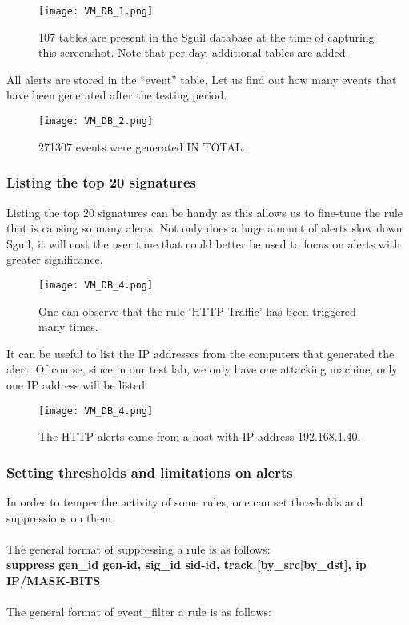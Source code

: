 \begin{figure}[h]
    \centering
    \texttt{[image: VM\_DB\_1.png]}
    \caption{107 tables are present in the Sguil database at the time of capturing this screenshot. Note that per day, additional tables are added.}
\end{figure}
\clearpage
All alerts are stored in the ``event'' table. Let us find out how many events that have been generated after the testing period.

\begin{figure}[h]
    \centering
    \texttt{[image: VM\_DB\_2.png]}
    \caption{271307 events were generated IN TOTAL.}
\end{figure}

\subsubsection{Listing the top 20 signatures}

Listing the top 20 signatures can be handy as this allows us to fine-tune the rule that is causing so many alerts. Not only does a huge amount of alerts slow down Sguil, it will cost the user time that could better be used to focus on alerts with greater significance.

\begin{figure}[h]
    \centering
    \texttt{[image: VM\_DB\_4.png]}
    \caption{One can observe that the rule `HTTP Traffic' has been triggered many times.}
\end{figure}
It can be useful to list the IP addresses from the computers that generated the alert. Of course, since in our test lab, we only have one attacking machine, only one IP address will be listed.
\begin{figure}[h]
    \centering
    \texttt{[image: VM\_DB\_4.png]}
    \caption{The HTTP alerts came from a host with IP address 192.168.1.40.}
\end{figure}

\subsubsection{Setting thresholds and limitations on alerts}

In order to temper the activity of some rules, one can set thresholds and suppressions on them. \\ \\
The general format of suppressing a rule is as follows: \\
\textbf{suppress gen\_id gen-id, sig\_id sid-id, track [by\_src|by\_dst], ip IP/MASK-BITS} \\ \\
The general format of event\_filter a rule is as follows: \\


